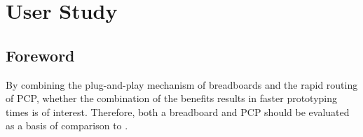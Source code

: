 \section{User Study}

\subsection{Foreword}
By combining the plug-and-play mechanism of breadboards and the rapid routing of PCP, whether the combination of the benefits results in faster prototyping times is of interest. Therefore, both a breadboard and PCP should be evaluated as a basis of comparison to \papertitle.






